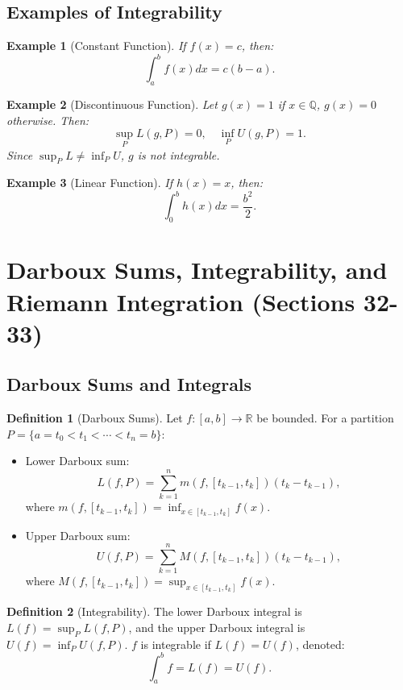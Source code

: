 \documentclass[9pt]{article}
\theoremstyle{definition}
\newtheorem{definition}{Definition}
\theoremstyle{plain}
\newtheorem{example}{Example}
\begin{document}
\subsection*{Examples of Integrability}
\begin{example}[Constant Function]
If \( f(x) = c \), then:
\[
\int_a^b f(x) dx = c(b-a).
\]
\end{example}

\begin{example}[Discontinuous Function]
Let \( g(x) = 1 \) if \( x \in \mathbb{Q} \), \( g(x) = 0 \) otherwise. Then:
\[
\sup_P L(g, P) = 0, \quad \inf_P U(g, P) = 1.
\]
Since \( \sup_P L \neq \inf_P U \), \( g \) is not integrable.
\end{example}

\begin{example}[Linear Function]
If \( h(x) = x \), then:
\[
\int_0^b h(x) dx = \frac{b^2}{2}.
\]
\end{example}
\section*{Darboux Sums, Integrability, and Riemann Integration (Sections 32-33)}

\subsection*{Darboux Sums and Integrals}
\begin{definition}[Darboux Sums]
Let \( f : [a, b] \to \mathbb{R} \) be bounded. For a partition \( P = \{a = t_0 < t_1 < \cdots < t_n = b\} \):
\begin{itemize}
    \item Lower Darboux sum:
    \[
    L(f, P) = \sum_{k=1}^n m(f, [t_{k-1}, t_k])(t_k - t_{k-1}),
    \]
    where \( m(f, [t_{k-1}, t_k]) = \inf_{x \in [t_{k-1}, t_k]} f(x) \).
    \item Upper Darboux sum:
    \[
    U(f, P) = \sum_{k=1}^n M(f, [t_{k-1}, t_k])(t_k - t_{k-1}),
    \]
    where \( M(f, [t_{k-1}, t_k]) = \sup_{x \in [t_{k-1}, t_k]} f(x) \).
\end{itemize}
\end{definition}

\begin{definition}[Integrability]
The lower Darboux integral is \( L(f) = \sup_P L(f, P) \), and the upper Darboux integral is \( U(f) = \inf_P U(f, P) \). \( f \) is integrable if \( L(f) = U(f) \), denoted:
\[
\int_a^b f = L(f) = U(f).
\]
\end{definition}
\end{document}
